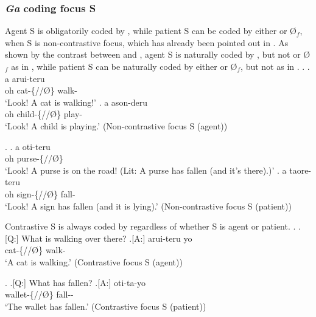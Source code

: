 

\subsubsection{\textit{Ga} coding focus S}

Agent S is obligatorily coded by ,
while patient S can be coded by either  or {\O$_{f}$},
when S is non-contrastive focus,
which has already been pointed out in .
As shown by the contrast between \Next and \NNext,
agent S is naturally coded by ,
but not  or {\O$_{f}$} as in \Next,
while patient S can be naturally coded by either  or {\O$_{f}$},
but not  as in \NNext.
%
\ex.\label{ExAgentS}
	\ag. a  arui-teru \\
	oh cat-\{//\O\} walk- \\
	`Look! A cat is walking!'
	\bg. a  ason-deru \\
		oh child-\{//\O\} play- \\
		`Look! A child is playing.' \hfill{(Non-contrastive focus S (agent))}

\ex.\label{ExPatientS}
	\ag. a  oti-teru \\
		oh purse-\{//\O\} \\
		`Look! A purse is on the road! (Lit: A purse has fallen (and it's there).)'
	\bg. a  taore-teru \\
		oh sign-\{//\O\} fall- \\
		`Look! A sign has fallen (and it is lying).' \hfill{(Non-contrastive focus S (patient))}


Contrastive S is always coded by 
regardless of whether S is agent or patient.
%
\ex.
 \a.[Q:] What is walking over there?
 \bg.[A:]  arui-teru yo \\
	cat-\{//\O\} walk-  \\
	`A cat is walking.' \hfill{(Contrastive focus S (agent))}

\ex. \a.[Q:] What has fallen?
	\bg.[A:]  oti-ta-yo \\
			wallet-\{//\O\} fall-- \\
			`The wallet has fallen.' \hfill{(Contrastive focus S (patient))}

